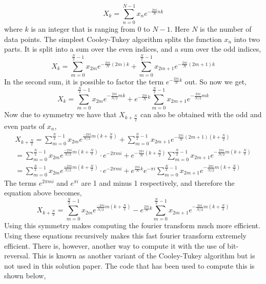 \begin{equation*}
X_k = \sum_{n=0}^{N-1}x_n e^{-\frac{2\pi i}{N}nk}
\end{equation*}
where $k$ is an integer that is ranging from 0 to $N-1$. Here $N$ is the number of data points. The simplest Cooley-Tukey algorithm splits the function $x_n$ into two parts. It is split into a sum over the even indices, and a sum over the odd indices,
\begin{equation*}
X_k = \sum_{m=0}^{\frac{N}{2} - 1} x_{2m}e^{-\frac{2\pi i}{N}(2m)k} + \sum_{m=0}^{\frac{N}{2}-1}x_{2m+1}e^{-\frac{2\pi i}{N}(2m+1)k}
\end{equation*}
In the second sum, it is possible to factor the term $e^{-\frac{2\pi i}{N}k}$ out. So now we get,
\begin{equation*}
X_k = \sum_{m=0}^{\frac{N}{2}-1}x_{2m}e^{-\frac{2\pi i}{N/2}mk} + e^{-\frac{2\pi i}{N}k}\sum_{m=0}^{\frac{N}{2}-1}x_{2m+1}e^{-\frac{2\pi i}{N/2}mk}
\end{equation*}
Now due to symmetry we have that $X_{k + \frac{N}{2}}$ can also be obtained with the odd and even parts of $x_n$,
\begin{gather*}
X_{k+\frac{N}{2}} = \sum_{m=0}^{\frac{N}{2}-1}x_{2m}e^{\frac{-2\pi i}{N/2}m(k+\frac{N}{2})} + \sum_{m=0}^{\frac{N}{2}-1} x_{2m+1}e^{-\frac{2\pi i}{N}(2m+1)(k+\frac{N}{2})}\\
=  \sum_{m=0}^{\frac{N}{2}-1}x_{2m}e^{\frac{-2\pi i}{N/2}m(k+\frac{N}{2})}\cdot e^{-2\pi m i} + e^{-\frac{2\pi i}{N}(k + \frac{N}{2})}\sum_{m=0}^{\frac{N}{2}-1} x_{2m+1} e^{-\frac{2\pi i}{N/2}m(k+\frac{N}{2})}\\
= \sum_{m=0}^{\frac{N}{2}-1}x_{2m}e^{\frac{-2\pi i}{N/2}m(k+\frac{N}{2})}\cdot e^{-2\pi m i} + e^{\frac{2\pi i}{N}k}e^{-\pi i}\sum_{m=0}^{\frac{N}{2}-1} x_{2m+1} e^{-\frac{2\pi i}{N/2}m(k+\frac{N}{2})}
\end{gather*}
The terms $e^{2\pi m i}$ and $e^{\pi i}$ are 1 and minus 1 respectively, and therefore the equation above becomes,
\begin{equation*}
X_{k+\frac{N}{2}} =  \sum_{m=0}^{\frac{N}{2}-1}x_{2m}e^{\frac{-2\pi i}{N/2}m(k+\frac{N}{2})} - e^{\frac{2\pi i}{N}k}\sum_{m=0}^{\frac{N}{2}-1} x_{2m+1} e^{-\frac{2\pi i}{N/2}m(k+\frac{N}{2})}
\end{equation*}
Using this symmetry makes computing the fourier transform much more efficient. Using these equations recursively makes this fast fourier transform extremely efficient. There is, however, another way to compute it with the use of bit-reversal. This is known as another variant of the Cooley-Tukey algorithm but is not used in this solution paper. The code that has been used to compute this is shown below,


